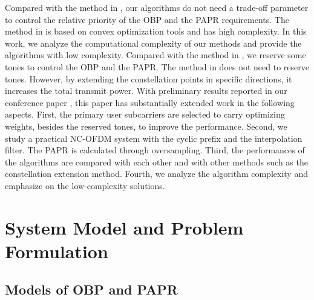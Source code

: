 \documentclass[paper]{ieice}
\begin{document}
Compared with the method in \cite{4411634}, our algorithms do not need a trade-off parameter to control the relative priority of the OBP and the PAPR requirements.  The method in \cite{4411634} is based on convex optimization tools and has high complexity.  In this work, we analyze the computational complexity of our methods and provide the algorithms with low complexity.  Compared with the method in \cite{ni2015joint}, we reserve some tones to control the OBP and the PAPR.  The method in \cite{ni2015joint} does not need to reserve tones.  However, by extending the constellation points in specific directions, it increases the total transmit power.  With preliminary results reported in our conference paper \cite{6831614}, this paper has substantially extended work in the following aspects. First, the primary user subcarriers are selected to carry optimizing weights, besides the reserved tones, to improve the performance. Second, we study a practical NC-OFDM system with the cyclic prefix and the interpolation filter. The PAPR is calculated through oversampling.  Third, the performances of the algorithms are compared with each other and with other methods such as the  constellation extension method.  Fourth, we analyze the algorithm complexity and emphasize on the low-complexity solutions.

\section{System Model and Problem Formulation} \label{sec:model}
\subsection{Models of OBP and PAPR}
\end{document}
